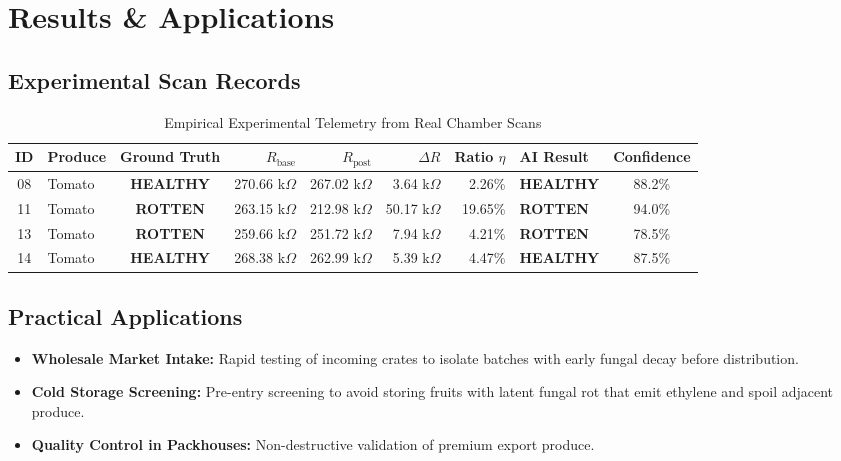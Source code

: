 \documentclass[11pt,a4paper]{article}
\begin{document}
\section{Results \& Applications}

\subsection{Experimental Scan Records}
\begin{table}[H]
\centering
\small
\begin{tabularx}{\textwidth}{c l c r r r r l c}
\toprule
\textbf{ID} & \textbf{Produce} & \textbf{Ground Truth} & \textbf{$R_{\text{base}}$} & \textbf{$R_{\text{post}}$} & \textbf{$\Delta R$} & \textbf{Ratio $\eta$} & \textbf{AI Result} & \textbf{Confidence} \\
\midrule
08 & Tomato & \textbf{HEALTHY} & 270.66 k$\Omega$ & 267.02 k$\Omega$ & 3.64 k$\Omega$ & 2.26\% & \textbf{HEALTHY} & 88.2\% \\
11 & Tomato & \textbf{ROTTEN} & 263.15 k$\Omega$ & 212.98 k$\Omega$ & 50.17 k$\Omega$ & 19.65\% & \textbf{ROTTEN} & 94.0\% \\
13 & Tomato & \textbf{ROTTEN} & 259.66 k$\Omega$ & 251.72 k$\Omega$ & 7.94 k$\Omega$ & 4.21\% & \textbf{ROTTEN} & 78.5\% \\
14 & Tomato & \textbf{HEALTHY} & 268.38 k$\Omega$ & 262.99 k$\Omega$ & 5.39 k$\Omega$ & 4.47\% & \textbf{HEALTHY} & 87.5\% \\
\bottomrule
\end{tabularx}
\caption{Empirical Experimental Telemetry from Real Chamber Scans}
\end{table}

\subsection{Practical Applications}
\begin{itemize}[leftmargin=*]
    \item \textbf{Wholesale Market Intake:} Rapid testing of incoming crates to isolate batches with early fungal decay before distribution.
    \item \textbf{Cold Storage Screening:} Pre-entry screening to avoid storing fruits with latent fungal rot that emit ethylene and spoil adjacent produce.
    \item \textbf{Quality Control in Packhouses:} Non-destructive validation of premium export produce.
\end{itemize}
\end{document}
